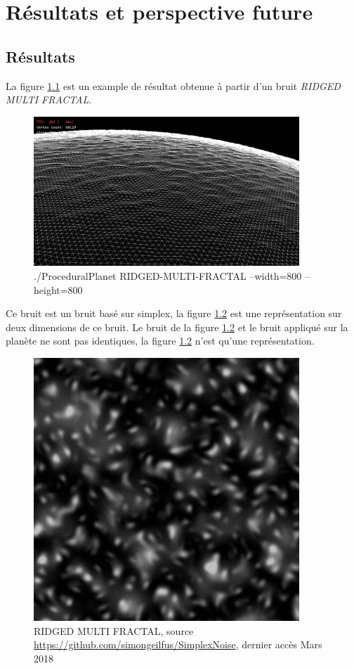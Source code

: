\chapter{Résultats et perspective future}

\section{Résultats}

La figure \ref{fig:rmf_800} est un example de résultat obtenue à partir d'un bruit \textit{RIDGED MULTI FRACTAL}. 

\begin{figure}
    \centering
    \includegraphics[width=10cm]{img/RMFV_w800_h800_wire_0.png}
    \caption{./ProceduralPlanet RIDGED-MULTI-FRACTAL --width=800 --height=800}
    \label{fig:rmf_800}
\end{figure}

Ce bruit est un bruit basé sur simplex, la figure \ref{fig:rmf} est une représentation sur deux dimensions de ce bruit. 
Le bruit de la figure \ref{fig:rmf} et le bruit appliqué sur la planète ne sont pas identiques, la figure \ref{fig:rmf} n'est qu'une représentation.

\begin{figure}
    \centering
    \includegraphics[width=10cm]{img/RMF.jpg}
    \caption{RIDGED MULTI FRACTAL, source \url{https://github.com/simongeilfus/SimplexNoise}, dernier accès Mars 2018}
    \label{fig:rmf}
\end{figure}

